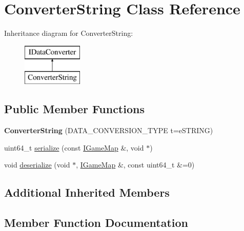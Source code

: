 \hypertarget{class_converter_string}{}\section{Converter\+String Class Reference}
\label{class_converter_string}
Inheritance diagram for Converter\+String\+:\begin{figure}[H]
\begin{center}
\leavevmode
\includegraphics[height=2.000000cm]{class_converter_string}
\end{center}
\end{figure}
\subsection*{Public Member Functions}
\begin{DoxyCompactItemize}
\item 
\hypertarget{class_converter_string_a8ae267829f74ca17677311a894983627}{}{\bfseries Converter\+String} (D\+A\+T\+A\+\_\+\+C\+O\+N\+V\+E\+R\+S\+I\+O\+N\+\_\+\+T\+Y\+P\+E t=e\+S\+T\+R\+I\+N\+G)\label{class_converter_string_a8ae267829f74ca17677311a894983627}

\item 
uint64\+\_\+t \hyperlink{class_converter_string_a2121d7fe89aa6c5fbf6551657e34fde8}{serialize} (const \hyperlink{class_i_game_map}{I\+Game\+Map} \&, void $\ast$)
\item 
void \hyperlink{class_converter_string_a437ae9e80cdd9aa0b66c11c14aa96c7f}{deserialize} (void $\ast$, \hyperlink{class_i_game_map}{I\+Game\+Map} \&, const uint64\+\_\+t \&=0)
\end{DoxyCompactItemize}
\subsection*{Additional Inherited Members}


\subsection{Member Function Documentation}
\hypertarget{class_converter_string_a437ae9e80cdd9aa0b66c11c14aa96c7f}{}
